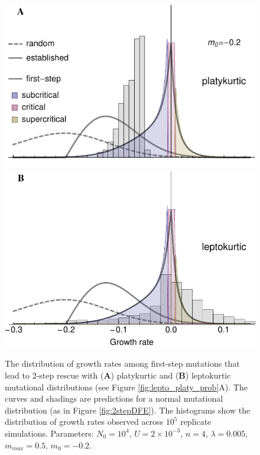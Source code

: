 \documentclass[9pt,twocolumn,twoside,lineno]{gsajnl}
\begin{document}
\begin{figure}[htbp]
\centering
\includegraphics[width=\linewidth]{dfe_platy_med_int.pdf}\\
\includegraphics[width=\linewidth]{dfe_lepto_med_int.pdf}\\
\caption{
The distribution of growth rates among first-step mutations that lead to 2-step rescue with (\textbf{A}) platykurtic and (\textbf{B}) leptokurtic mutational distributions (see Figure \ref{fig:lepto_platy_prob}A).
The curves and shadings are predictions for a normal mutational distribution (as in Figure \ref{fig:2stepDFE}).
The histograms show the distribution of growth rates observed across $10^5$ replicate simulations.
Parameters: $N_0=10^4$, $U=2\times 10^{-3}$, $n=4$, $\lambda=0.005$, $m_{max}=0.5$, $m_0=-0.2$.
}%
\label{fig:lepto_platy_dfe_int}
\end{figure}
\end{document}
